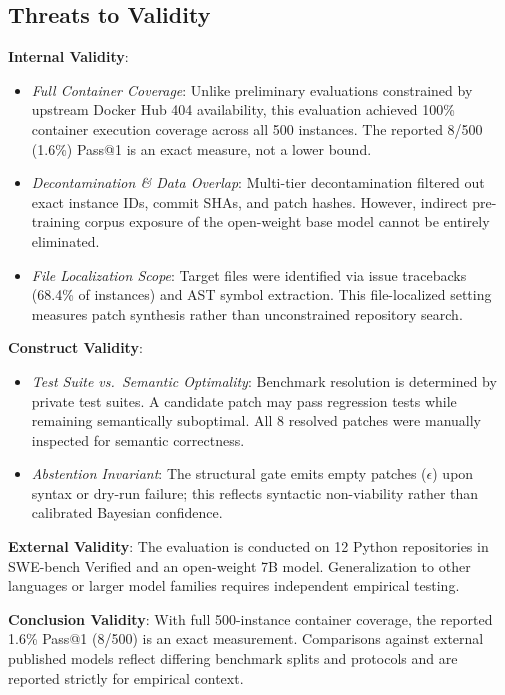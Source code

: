 \documentclass[10pt,twocolumn,letterpaper]{article}
\begin{document}
\subsection{Threats to Validity}
\noindent \textbf{Internal Validity}:
\begin{itemize}
    \item \textit{Full Container Coverage}: Unlike preliminary evaluations constrained by upstream Docker Hub 404 availability, this evaluation achieved 100\% container execution coverage across all 500 instances. The reported 8/500 (1.6\%) Pass@1 is an exact measure, not a lower bound.
    \item \textit{Decontamination \& Data Overlap}: Multi-tier decontamination filtered out exact instance IDs, commit SHAs, and patch hashes. However, indirect pre-training corpus exposure of the open-weight base model cannot be entirely eliminated.
    \item \textit{File Localization Scope}: Target files were identified via issue tracebacks (68.4\% of instances) and AST symbol extraction. This file-localized setting measures patch synthesis rather than unconstrained repository search.
\end{itemize}

\noindent \textbf{Construct Validity}:
\begin{itemize}
    \item \textit{Test Suite vs.\ Semantic Optimality}: Benchmark resolution is determined by private test suites. A candidate patch may pass regression tests while remaining semantically suboptimal. All 8 resolved patches were manually inspected for semantic correctness.
    \item \textit{Abstention Invariant}: The structural gate emits empty patches ($\epsilon$) upon syntax or dry-run failure; this reflects syntactic non-viability rather than calibrated Bayesian confidence.
\end{itemize}

\noindent \textbf{External Validity}:
The evaluation is conducted on 12 Python repositories in SWE-bench Verified and an open-weight 7B model. Generalization to other languages or larger model families requires independent empirical testing.

\noindent \textbf{Conclusion Validity}:
With full 500-instance container coverage, the reported 1.6\% Pass@1 (8/500) is an exact measurement. Comparisons against external published models reflect differing benchmark splits and protocols and are reported strictly for empirical context.
\end{document}
